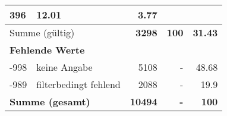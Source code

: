 \begin{longtable}{lXrrr}
       \num{396} &
       \num[round-mode=places,round-precision=2]{12.01} &
         \num[round-mode=places,round-precision=2]{3.77} \\
     \midrule
     \multicolumn{2}{l}{Summe (gültig)} &
       \textbf{\num{3298}} &
     \textbf{\num{100}} &
       \textbf{\num[round-mode=places,round-precision=2]{31.43}} \\
     \multicolumn{5}{l}{\textbf{Fehlende Werte}}\\
       -998 &
       keine Angabe &
         \num{5108} &
        - &
         \num[round-mode=places,round-precision=2]{48.68} \\
       -989 &
       filterbedingt fehlend &
         \num{2088} &
        - &
         \num[round-mode=places,round-precision=2]{19.9} \\
     \midrule
     \multicolumn{2}{l}{\textbf{Summe (gesamt)}} &
          \textbf{\num{10494}} &
        \textbf{-} &
        \textbf{\num{100}} \\
     \bottomrule
     \end{longtable}
     
